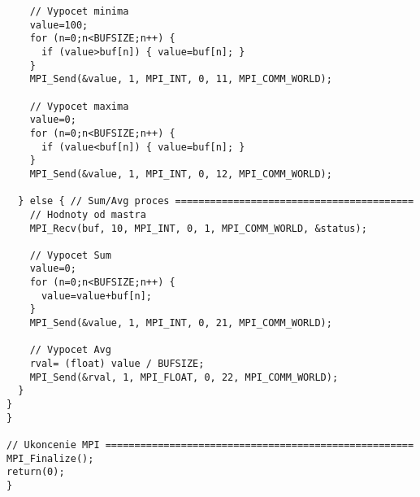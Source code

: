 \documentclass{report}
\begin{document}
\begin{lstlisting}
	// Vypocet minima
    value=100; 
    for (n=0;n<BUFSIZE;n++) {
      if (value>buf[n]) { value=buf[n]; }
    }   
    MPI_Send(&value, 1, MPI_INT, 0, 11, MPI_COMM_WORLD);

	// Vypocet maxima
    value=0; 
    for (n=0;n<BUFSIZE;n++) {
      if (value<buf[n]) { value=buf[n]; }
    }   
    MPI_Send(&value, 1, MPI_INT, 0, 12, MPI_COMM_WORLD);

  } else { // Sum/Avg proces =========================================
	// Hodnoty od mastra
    MPI_Recv(buf, 10, MPI_INT, 0, 1, MPI_COMM_WORLD, &status);

	// Vypocet Sum
    value=0; 
    for (n=0;n<BUFSIZE;n++) {
      value=value+buf[n]; 
    }   
    MPI_Send(&value, 1, MPI_INT, 0, 21, MPI_COMM_WORLD);

	// Vypocet Avg
    rval= (float) value / BUFSIZE; 
    MPI_Send(&rval, 1, MPI_FLOAT, 0, 22, MPI_COMM_WORLD);
  } 
}
}

// Ukoncenie MPI =====================================================
MPI_Finalize();
return(0);
}
\end{lstlisting}
\end{document}
